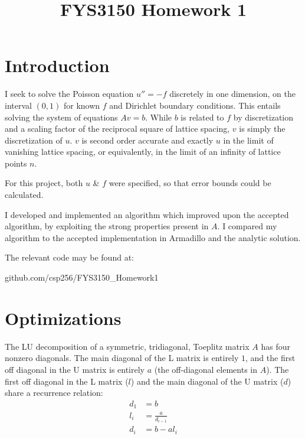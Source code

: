 \documentclass[10pt, conference, compsocconf]{IEEEtran}
\begin{document}
\title{FYS3150 Homework 1}
\author{
}
\maketitle


\IEEEpeerreviewmaketitle

\section{Introduction}
I seek to solve the Poisson equation $u'' = -f$ discretely in one dimension, on the interval $\left(0,1\right)$ for known $f$ and Dirichlet boundary conditions. This entails solving the system of equations $Av=b$. While $b$ is related to $f$ by discretization and a scaling factor of the reciprocal square of lattice spacing, $v$ is simply the discretization of $u$. $v$ is second order accurate and exactly $u$ in the limit of vanishing lattice spacing, or equivalently, in the limit of an infinity of lattice points $n$. 

For this project, both $u$ \& $f$ were specified, so that error bounds could be calculated.

I developed and implemented an algorithm which improved upon the accepted algorithm, by exploiting the strong properties present in $A$. I compared my algorithm to the accepted implementation in Armadillo and the analytic solution. 

The relevant code may be found at: 

\centerline{github.com/csp256/FYS3150\_Homework1}


\section{Optimizations}
The LU decomposition of a symmetric, tridiagonal, Toeplitz matrix $A$ has four nonzero diagonals. The main diagonal of the L matrix is entirely $1$, and the first off diagonal in the U matrix is entirely $a$ (the off-diagonal elements in $A$). The first off diagonal in the L matrix ($l$) and the main diagonal of the U matrix ($d$) share a recurrence relation:
\begin{align}d_1 &= b\\
l_i &= \frac{a}{d_{i-1}}\\
d_i &= b - al_i
\end{align}
\end{document}

